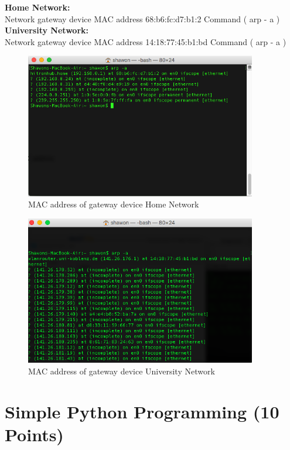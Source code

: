 \documentclass{WeSTassignment}
\begin{document}
\textbf{Home Network:\\}
Network gateway device MAC address 68:b6:fc:d7:b1:2 Command ( arp - a )\\
\textbf{University Network:\\}
Network gateway device MAC address 14:18:77:45:b1:bd Command ( arp - a )\\ 
\begin{figure}[bp!]
  \centering
  \includegraphics[width=0.9\textwidth]{home_mac.png}
   \caption{MAC address of gateway device Home Network}
     \label{fig:macaddress}
\end{figure}
\begin{figure}[bp!]
  \centering
  \includegraphics[width=0.9\textwidth]{uni_mac.png}
   \caption{MAC address of gateway device University Network}
     \label{fig:macaddress}
\end{figure}



\section{Simple Python Programming (10 Points)}
\end{document}
